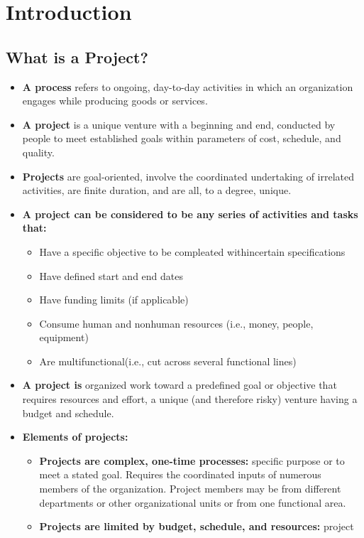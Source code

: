 \chapter{Introduction}

\clearpage
\section{What is a Project?}

	\begin{itemize}
		\item{\bf A process} refers to ongoing, day-to-day activities in which an 
		organization engages while producing goods or services.
		\item{\bf A project} is a unique venture with a beginning and end, conducted by people
		to meet established goals within parameters of cost, schedule, and quality. 
		\item{\bf Projects} are goal-oriented, involve the coordinated undertaking of 
		irrelated activities, are finite duration, and are all, to a degree, unique.
		\item{\bf A project can be considered to be any series of activities and tasks that:}
			\begin{itemize}
				\item Have a specific objective to be compleated withincertain specifications
				\item Have defined start and end dates
				\item Have funding limits (if applicable)
				\item Consume human and nonhuman resources (i.e., money, people, equipment)
				\item Are multifunctional(i.e., cut across several functional lines)
			\end{itemize} 
		\item{\bf A project is} organized work toward a predefined goal or objective that
		requires resources and effort, a unique (and therefore risky) venture having a 
		budget and schedule. 
		\item{\bf Elements of projects:}
			\begin{itemize}
				\item {\bf Projects are complex, one-time processes:} specific purpose or to meet
				a stated goal. Requires the coordinated inputs of numerous members of the 
				organization. Project members may be from different departments or other 
				organizational units or from one functional area. 
				\item {\bf Projects are limited by budget, schedule, and resources:} project 

\end{itemize}
\end{itemize}

